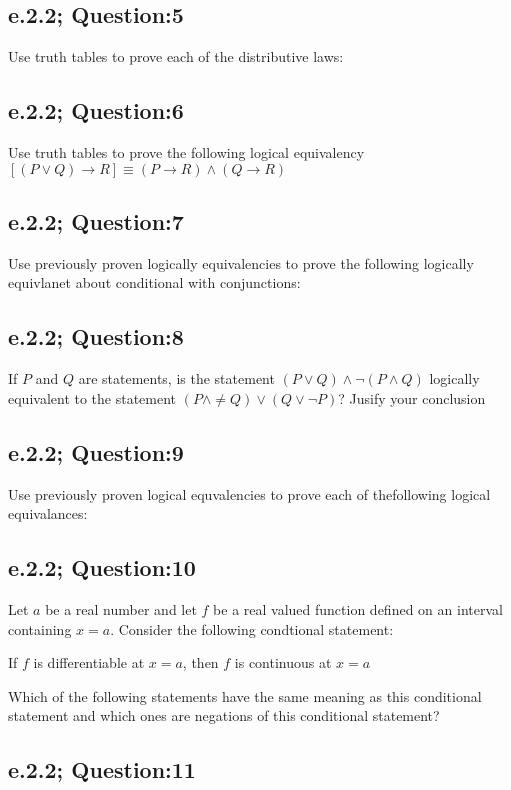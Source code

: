 \subsection{e.2.2; Question:5}
Use truth tables to prove each of the distributive laws: 


\subsection{e.2.2; Question:6}
Use truth tables to prove the following logical equivalency $[
(P \vee Q) \to R] \equiv (P \to R) \wedge (Q \to R)$



\subsection{e.2.2; Question:7}
Use previously proven logically equivalencies to prove the following logically equivlanet about conditional with conjunctions:


\subsection{e.2.2; Question:8}
If $P$ and $Q$ are statements, is the statement $(P \vee Q) \wedge \neg(P \wedge Q)$ logically equivalent to the statement $(P \wedge \neq Q) \vee (Q \vee \neg P)$? Jusify your conclusion


\subsection{e.2.2; Question:9}
Use previously proven logical equvalencies to prove each of thefollowing logical equivalances: 


\subsection{e.2.2; Question:10}
Let $a$ be a real number and let $f$ be a real valued function defined on an interval containing $x = a$. Consider the following condtional statement: 
	\begin{center}
		If $f$ is differentiable at $x=a$, then $f$ is continuous at $x = a$
	\end{center}
Which of the following statements have the same meaning as this conditional statement and which ones are negations of this conditional statement?

\subsection{e.2.2; Question:11}

